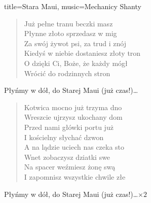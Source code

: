 \begin{song}{title={Stara Maui}, music={Mechanicy Shanty}}
\begin{multicols}{2}
\begin{verse}
        Już pełne tranu beczki masz \\
        Płynne złoto sprzedasz w mig \smallskip\\
        Za swój żywot psi, za trud i znój \\
        Kiedyś w niebie dostaniesz złoty tron \\
        O dzięki Ci, Boże, że każdy mógł \\
        Wrócić do rodzinnych stron
    \end{verse}
    \begin{chorus}
        Płyńmy w dół, do Starej Maui (już czas!)\ldots
    \end{chorus}
    \begin{verse}
        Kotwica mocno już trzyma dno \\
        Wreszcie ujrzysz ukochany dom \\
        Przed nami główki portu już \\
        I kościelny słychać dzwon \smallskip \\
        A na lądzie uciech nas czeka sto \\
        Wnet zobaczysz dziatki swe \\
        Na spacer weźmiesz żonę swą \\
        I zapomnisz wszystkie chwile złe
    \end{verse}
    \begin{chorus}
        Płyńmy w dół, do Starej Maui (już czas!)\ldots $\times 2$
    \end{chorus}
    \end{multicols}
\end{song}

